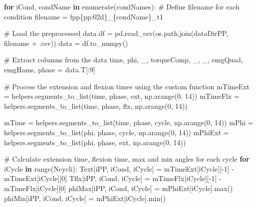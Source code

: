 \documentclass[
  11pt,
  a4paper]{article}
\newenvironment{Shaded}{\begin{snugshade}}{\end{snugshade}}
\newcommand{\BuiltInTok}[1]{\textcolor[rgb]{0.00,0.23,0.31}{#1}}
\newcommand{\CommentTok}[1]{\textcolor[rgb]{0.37,0.37,0.37}{#1}}
\newcommand{\ControlFlowTok}[1]{\textcolor[rgb]{0.00,0.23,0.31}{\textbf{#1}}}
\newcommand{\DecValTok}[1]{\textcolor[rgb]{0.68,0.00,0.00}{#1}}
\newcommand{\KeywordTok}[1]{\textcolor[rgb]{0.00,0.23,0.31}{\textbf{#1}}}
\newcommand{\NormalTok}[1]{\textcolor[rgb]{0.00,0.23,0.31}{#1}}
\newcommand{\OperatorTok}[1]{\textcolor[rgb]{0.37,0.37,0.37}{#1}}
\newcommand{\SpecialCharTok}[1]{\textcolor[rgb]{0.37,0.37,0.37}{#1}}
\newcommand{\SpecialStringTok}[1]{\textcolor[rgb]{0.13,0.47,0.30}{#1}}
\newcommand{\StringTok}[1]{\textcolor[rgb]{0.13,0.47,0.30}{#1}}
\begin{document}
\begin{Shaded}
\begin{Highlighting}[]
    \ControlFlowTok{for}\NormalTok{ iCond, condName }\KeywordTok{in} \BuiltInTok{enumerate}\NormalTok{(condNames):}
        \CommentTok{\# Define filename for each condition}
\NormalTok{        filename }\OperatorTok{=} \SpecialStringTok{f\textquotesingle{}pp}\SpecialCharTok{\{}\NormalTok{pp}\SpecialCharTok{:02d\}}\SpecialStringTok{\_}\SpecialCharTok{\{}\NormalTok{condName}\SpecialCharTok{\}}\SpecialStringTok{\_t1\textquotesingle{}}
        
        \CommentTok{\# Load the preprocessed data}
\NormalTok{        df }\OperatorTok{=}\NormalTok{ pd.read\_csv(os.path.join(dataDirPP, filename }\OperatorTok{+} \StringTok{\textquotesingle{}.csv\textquotesingle{}}\NormalTok{))}
\NormalTok{        data }\OperatorTok{=}\NormalTok{ df.to\_numpy()}
        
        \CommentTok{\# Extract columns from the data}
\NormalTok{        time, phi, \_, torqueComp, \_, \_, emgQuad, emgHams, phase }\OperatorTok{=}\NormalTok{ data.T[:}\DecValTok{9}\NormalTok{]}

        \CommentTok{\# Process the extension and flexion times using the custom function}
\NormalTok{        mTimeExt }\OperatorTok{=}\NormalTok{ helpers.segments\_to\_list(time, phase, }\StringTok{\textquotesingle{}ext\textquotesingle{}}\NormalTok{, np.arange(}\DecValTok{0}\NormalTok{, }\DecValTok{14}\NormalTok{))}
\NormalTok{        mTimeFlx }\OperatorTok{=}\NormalTok{ helpers.segments\_to\_list(time, phase, }\StringTok{\textquotesingle{}flx\textquotesingle{}}\NormalTok{, np.arange(}\DecValTok{0}\NormalTok{, }\DecValTok{14}\NormalTok{))}
        
\NormalTok{        mTime }\OperatorTok{=}\NormalTok{ helpers.segments\_to\_list(time, phase, }\StringTok{\textquotesingle{}cycle\textquotesingle{}}\NormalTok{, np.arange(}\DecValTok{0}\NormalTok{, }\DecValTok{14}\NormalTok{))}
\NormalTok{        mPhi }\OperatorTok{=}\NormalTok{ helpers.segments\_to\_list(phi, phase, }\StringTok{\textquotesingle{}cycle\textquotesingle{}}\NormalTok{, np.arange(}\DecValTok{0}\NormalTok{, }\DecValTok{14}\NormalTok{))}
\NormalTok{        mPhiExt }\OperatorTok{=}\NormalTok{ helpers.segments\_to\_list(phi, phase, }\StringTok{\textquotesingle{}ext\textquotesingle{}}\NormalTok{, np.arange(}\DecValTok{0}\NormalTok{, }\DecValTok{14}\NormalTok{))}
        
        \CommentTok{\# Calculate extension time, flexion time, max and min angles for each cycle}
        \ControlFlowTok{for}\NormalTok{ iCycle }\KeywordTok{in} \BuiltInTok{range}\NormalTok{(Ncycli):}
\NormalTok{            Text[iPP, iCond, iCycle] }\OperatorTok{=}\NormalTok{ mTimeExt[iCycle][}\OperatorTok{{-}}\DecValTok{1}\NormalTok{] }\OperatorTok{{-}}\NormalTok{ mTimeExt[iCycle][}\DecValTok{0}\NormalTok{]}
\NormalTok{            Tflx[iPP, iCond, iCycle] }\OperatorTok{=}\NormalTok{ mTimeFlx[iCycle][}\OperatorTok{{-}}\DecValTok{1}\NormalTok{] }\OperatorTok{{-}}\NormalTok{ mTimeFlx[iCycle][}\DecValTok{0}\NormalTok{]}
\NormalTok{            phiMax[iPP, iCond, iCycle] }\OperatorTok{=}\NormalTok{ mPhiExt[iCycle].}\BuiltInTok{max}\NormalTok{()}
\NormalTok{            phiMin[iPP, iCond, iCycle] }\OperatorTok{=}\NormalTok{ mPhiExt[iCycle].}\BuiltInTok{min}\NormalTok{()}
            

\end{Highlighting}
\end{Shaded}
\end{document}
